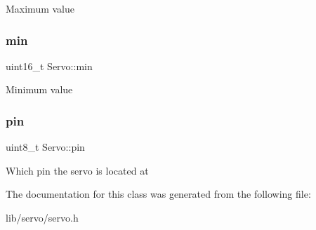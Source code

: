 Maximum value \hypertarget{class_servo_ad04fdb646ea971c3a1395d92a64a2a1a}{}\label{class_servo_ad04fdb646ea971c3a1395d92a64a2a1a} 
\subsubsection{\texorpdfstring{min}{min}}
{\footnotesize\ttfamily uint16\+\_\+t Servo\+::min\hspace{0.3cm}{\ttfamily [private]}}

Minimum value \hypertarget{class_servo_a11962573ddd272b426724e62c250990e}{}\label{class_servo_a11962573ddd272b426724e62c250990e} 
\subsubsection{\texorpdfstring{pin}{pin}}
{\footnotesize\ttfamily uint8\+\_\+t Servo\+::pin\hspace{0.3cm}{\ttfamily [private]}}

Which pin the servo is located at 

The documentation for this class was generated from the following file\+:\begin{DoxyCompactItemize}
\item 
lib/servo/servo.\+h\end{DoxyCompactItemize}
